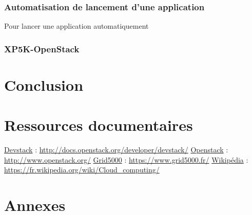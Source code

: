 \documentclass{report}
\begin{document}
        \subsection{Automatisation de lancement d'une application}
            Pour lancer une application automatiquement
            
        \subsection{XP5K-OpenStack}
\newpage
\chapter*{Conclusion}
 

\newpage
\chapter*{Ressources documentaires}
\href{http://docs.openstack.org/developer/devstack/}{Devstack} :
\url{http://docs.openstack.org/developer/devstack/}
\bigbreak
\href{http://www.openstack.org/}{Openstack} :
\url{http://www.openstack.org/}
\bigbreak
\href{https://www.grid5000.fr/}{Grid5000} :
\url{https://www.grid5000.fr/}
\bigbreak
\href{https://fr.wikipedia.org/wiki/Cloud_computing/}{Wikipédia} :
\url{https://fr.wikipedia.org/wiki/Cloud_computing/}



\newpage
\chapter*{Annexes}
\end{document}
